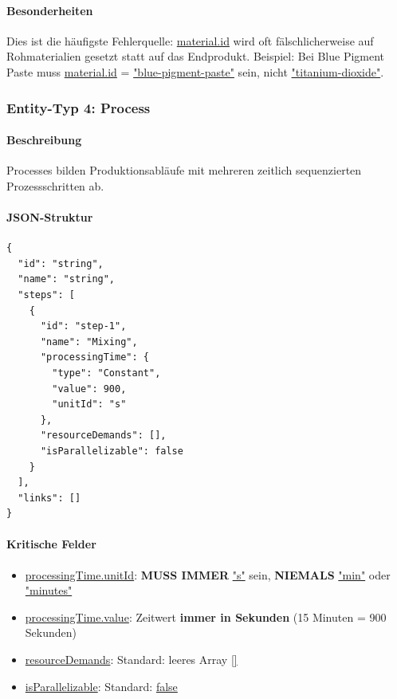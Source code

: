 \paragraph{Besonderheiten}

Dies ist die häufigste Fehlerquelle: \url{material.id} wird oft fälschlicherweise auf Rohmaterialien gesetzt statt auf das Endprodukt. Beispiel: Bei \glqq Blue Pigment Paste\grqq{} muss \url{material.id} = \url{"blue-pigment-paste"} sein, nicht \url{"titanium-dioxide"}.

\subsubsection{Entity-Typ 4: Process}

\paragraph{Beschreibung}

Processes bilden Produktionsabläufe mit mehreren zeitlich sequenzierten Prozessschritten ab.

\paragraph{JSON-Struktur}

\begin{verbatim}
{
  "id": "string",
  "name": "string",
  "steps": [
    {
      "id": "step-1",
      "name": "Mixing",
      "processingTime": {
        "type": "Constant",
        "value": 900,
        "unitId": "s"
      },
      "resourceDemands": [],
      "isParallelizable": false
    }
  ],
  "links": []
}
\end{verbatim}

\paragraph{Kritische Felder}

\begin{itemize}
    \item \url{processingTime.unitId}: \textbf{MUSS IMMER} \url{"s"} sein, \textbf{NIEMALS} \url{"min"} oder \url{"minutes"}
    \item \url{processingTime.value}: Zeitwert \textbf{immer in Sekunden} (15 Minuten = 900 Sekunden)
    \item \url{resourceDemands}: Standard: leeres Array \url{[]}
    \item \url{isParallelizable}: Standard: \url{false}
\end{itemize}

